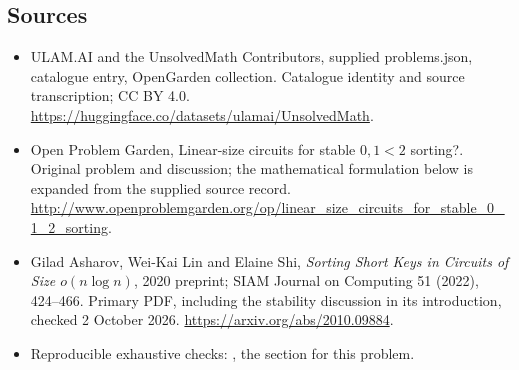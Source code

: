 \documentclass[11pt,a4paper]{article}
\begin{document}
\subsection{Sources}
\begin{itemize}
\item[S1] ULAM.AI and the UnsolvedMath Contributors, supplied problems.json, catalogue entry, OpenGarden collection. Catalogue identity and source transcription; CC BY 4.0.
\url{https://huggingface.co/datasets/ulamai/UnsolvedMath}.
\item[S2] Open Problem Garden, Linear-size circuits for stable $0,1 < 2$ sorting?. Original problem and discussion; the mathematical formulation below is expanded from the supplied source record.
\url{http://www.openproblemgarden.org/op/linear_size_circuits_for_stable_0_1_2_sorting}.

\item[R1] Gilad Asharov, Wei-Kai Lin and Elaine Shi, \emph{Sorting
Short Keys in Circuits of Size $o(n\log n)$}, 2020 preprint; SIAM
Journal on Computing 51 (2022), 424--466. Primary PDF, including the
stability discussion in its introduction, checked 2 October 2026.
\url{https://arxiv.org/abs/2010.09884}.
\item[R2] Reproducible exhaustive checks:
, the section for this problem.

\end{itemize}
\end{document}
